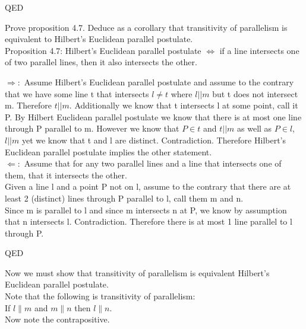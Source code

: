 \documentclass[12pt,letterpaper]{article}
\newcommand{\Proof}{\noindent {\bf Proof: }}
\newcommand{\QED}{\begin{flushright}QED\end{flushright}}
\newcommand{\prob}[1]{\newpage\noindent {\bf #1}}
\begin{document}
\QED





\prob{10} Prove proposition 4.7.  Deduce as a corollary that transitivity of parallelism is equivalent to Hilbert's Euclidean parallel postulate.\\

\noindent Proposition 4.7: Hilbert's Euclidean parallel postulate $\Leftrightarrow$ if a line intersects one of two parallel lines, then it also intersects the other. \\


\Proof

\noindent $\Rightarrow:$  Assume Hilbert's Euclidean parallel postulate and assume to the contrary that we have some line t that intersects $l\neq t$ where $l||m$ but t does not intersect m. Therefore $t || m$.    Additionally we know that t intersects l at some point, call it P.  By Hilbert Euclidean parallel postulate we know that there is at most one line through P parallel to m.  However we know that $P \in t$ and $t||m$ as well as $P \in l$, $l ||m$ yet we know that t and l are distinct.  Contradiction.  Therefore Hilbert's Euclidean parallel postulate implies the other statement.\\




\noindent $\Leftarrow:$ Assume that for any two parallel lines and a line that intersects one of them, that it intersects the other.  \\


Given a line l and a point P not on l, assume to the contrary that there are at least 2 (distinct) lines through P parallel to l, call them m and n.  \\

Since m is parallel to l and since m intersects n at P, we know by assumption that n intersects l.  Contradiction.  Therefore there is at most 1 line parallel to l through P.

\QED

Now we must show that transitivity of parallelism is equivalent Hilbert's Euclidean parallel postulate.\\

Note that the following is transitivity of parallelism:\\

If $l \parallel m$ and $m \parallel n$ then $l \parallel n$.  \\

Now note the contrapositive.  \\
\end{document}
